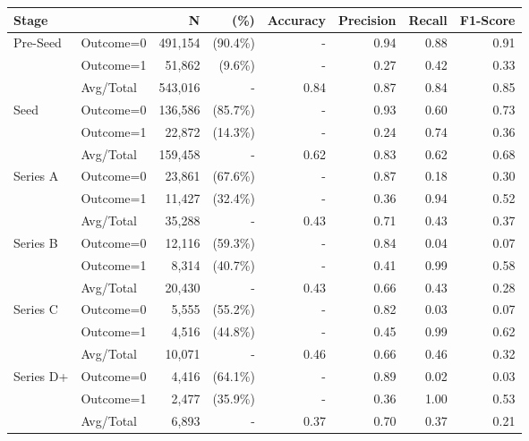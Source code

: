 \begin{tabular}{llrrrrrr} \toprule
\multicolumn{2}{l}{Stage} & N & (\%)    & Accuracy & Precision   & Recall & F1-Score \\ \midrule
Pre-Seed     & Outcome=0 & 491,154 & (90.4\%) & - & 0.94 & 0.88 & 0.91 \\
             & Outcome=1 & 51,862 & (9.6\%) & - & 0.27 & 0.42 & 0.33 \\
             & Avg/Total & 543,016 & - & 0.84 & 0.87 & 0.84 & 0.85 \\
Seed         & Outcome=0 & 136,586 & (85.7\%) & - & 0.93 & 0.60 & 0.73 \\
             & Outcome=1 & 22,872 & (14.3\%) & - & 0.24 & 0.74 & 0.36 \\
             & Avg/Total & 159,458 & - & 0.62 & 0.83 & 0.62 & 0.68 \\
Series A     & Outcome=0 & 23,861 & (67.6\%) & - & 0.87 & 0.18 & 0.30 \\
             & Outcome=1 & 11,427 & (32.4\%) & - & 0.36 & 0.94 & 0.52 \\
             & Avg/Total & 35,288 & - & 0.43 & 0.71 & 0.43 & 0.37 \\
Series B     & Outcome=0 & 12,116 & (59.3\%) & - & 0.84 & 0.04 & 0.07 \\
             & Outcome=1 & 8,314 & (40.7\%) & - & 0.41 & 0.99 & 0.58 \\
             & Avg/Total & 20,430 & - & 0.43 & 0.66 & 0.43 & 0.28 \\
Series C     & Outcome=0 & 5,555 & (55.2\%) & - & 0.82 & 0.03 & 0.07 \\
             & Outcome=1 & 4,516 & (44.8\%) & - & 0.45 & 0.99 & 0.62 \\
             & Avg/Total & 10,071 & - & 0.46 & 0.66 & 0.46 & 0.32 \\
Series D+    & Outcome=0 & 4,416 & (64.1\%) & - & 0.89 & 0.02 & 0.03 \\
             & Outcome=1 & 2,477 & (35.9\%) & - & 0.36 & 1.00 & 0.53 \\
             & Avg/Total & 6,893 & - & 0.37 & 0.70 & 0.37 & 0.21 \\
\bottomrule \end{tabular}
